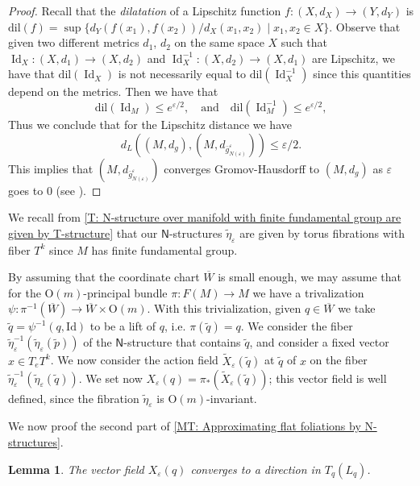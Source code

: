 \documentclass[12pt,a4paper,reqno]{amsart}
\newtheorem{lemma}[theorem]{Lemma}
\theoremstyle{definition}
\numberwithin{equation}{section}
\newcommand{\Ns}{\mathsf{N}}
\newcommand{\Or}{\mathrm{O}}
\DeclareMathOperator{\Id}{Id}
\begin{document}
\begin{proof}
Recall that the \emph{dilatation} of a Lipschitz function $f\colon (X,d_X)\to (Y,d_Y)$ is $\mathrm{dil}(f)=\sup\{d_Y(f(x_1),f(x_2))/d_X(x_1,x_2)\mid x_1,x_2\in X\}$. Observe that given two different metrics $d_1$, $d_2$ on the same space $X$ such that $\Id_X\colon (X,d_1)\to (X,d_2)$ and $\Id_X^{-1}\colon (X,d_2)\to(X,d_1)$ are Lipschitz, we have that $\mathrm{dil}(\Id_X)$ is not necessarily equal to $\mathrm{dil}(\Id_X^{-1})$ since this quantities depend on the metrics. Then we have that
\[
\mathrm{dil}(\Id_M)\leq e^{\varepsilon/2},\quad\mbox{and}\quad \mathrm{dil}(\Id_M^{-1})\leq e^{\varepsilon/2},
\]
 Thus we conclude that for the Lipschitz distance we have
\[
d_L((M,d_g),(M,d_{\bar{g}^\varepsilon_{N(\varepsilon)}}))\leq \varepsilon/2.
\]
This implies that $(M,d_{\bar{g}^\varepsilon_{N(\varepsilon)}})$ converges Gromov-Hausdorff to $(M,d_g)$ as $\varepsilon$ goes to $0$ (see \cite[Example 7.4.3]{BuragoBuragoIvanov}).
\end{proof}

We recall from \th\ref{T: N-structure over manifold with finite fundamental group are given by T-structure} that our $\Ns$-structures $\widetilde{\eta}_\varepsilon$ are given by torus fibrations with fiber $T^k$ since $M$ has finite fundamental group.

By assuming that the coordinate chart $\overline{W}$ is small enough, we may assume  that for the $\Or(m)$-principal bundle $\pi\colon F(M)\to M$ we have a trivalization $\psi\colon \pi^{-1}(\overline{W})\to \overline{W}\times \Or(m)$. With this trivialization, given $q\in \overline{W}$ we take $\tilde{q} = \psi^{-1}(q,\mathrm{Id})$ to be a lift of $q$, i.e. $\pi(\tilde{q}) = q$. We consider the fiber $\widetilde{\eta}_\varepsilon^{-1}(\widetilde{\eta}_\varepsilon(\tilde{p}))$ of the $\Ns$-structure that contains $\tilde{q}$, and consider a fixed vector $x\in T_e T^k$. We now consider the action field $\widetilde{X}_\varepsilon(\tilde{q})$ at $\tilde{q}$  of $x$ on the fiber $\widetilde{\eta}^{-1}_\varepsilon(\tilde{\eta}_\varepsilon(\tilde{q}))$. We set now $X_\varepsilon(q) = \pi_\ast(\widetilde{X}_\varepsilon(\tilde{q}))$; this vector field is well defined, since the fibration $\widetilde{\eta}_\varepsilon$ is $\Or(m)$-invariant. 

We now proof the second part of \th\ref{MT: Approximating flat foliations by N-structures}.

\begin{lemma}
The vector field $X_\varepsilon(q)$ converges to a direction in $T_q(L_q)$.
\end{lemma}
\end{document}
